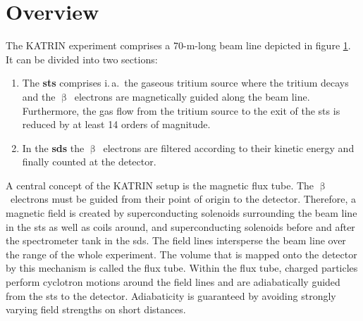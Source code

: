 \section{Overview}
\label{sec:katrinExpSetupOverview}
\begin{figure}[t]
	\label{fig:katrinExpSetupBeamline}
\end{figure}
The KATRIN experiment comprises a 70-m-long beam line depicted in figure \ref{fig:katrinExpSetupBeamline}. It can be divided into two sections: 
\begin{enumerate}
	\item The \textbf{\gls{sts}} comprises i.\,a.~the gaseous tritium source where the tritium decays and the $\upbeta$~electrons are magnetically guided along the beam line. Furthermore, the gas flow from the tritium source to the exit of the \gls{sts} is reduced by at least 14 orders of magnitude.
	\item In the \textbf{\gls{sds}} the $\upbeta$~electrons are filtered according to their kinetic energy and finally counted at the detector.
\end{enumerate}
A central concept of the KATRIN setup is the magnetic flux tube. The $\upbeta$~electrons must be guided from their point of origin to the detector. Therefore, a magnetic field is created by superconducting solenoids surrounding the beam line in the \gls{sts} as well as coils around, and superconducting solenoids before and after the spectrometer tank in the \gls{sds}. The field lines intersperse the beam line over the range of the whole experiment. The volume that is mapped onto the detector by this mechanism is called the flux tube. Within the flux tube, charged particles perform cyclotron motions around the field lines and are adiabatically guided from the \gls{sts} to the detector. Adiabaticity is guaranteed by avoiding strongly varying field strengths on short distances. 

